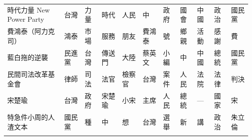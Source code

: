 \documentclass[a4paper, 10pt, conference]{ieeeconf}       %
\begin{document}
\begin{CJK}{UTF8}{bsmi}
\begin{longtable}[c]{@{}L{2.45cm}L{1.1cm}L{1.1cm}L{1.1cm}L{1.1cm}L{1.1cm}L{1.1cm}L{1.1cm}L{1.41cm}L{1.1cm}L{1.1cm}@{}}
時代力量 New Power Party & 台灣 & 力量 & 時代 & 人民 & 中 & 政府 & 國會 & 中國 & 政治 & 國民黨 \\
費鴻泰（阿力克司） & 鴻泰 & 市場 & 服務 & 朋友 & 費鴻泰 & 號 & 鄉親 & 活動 & 感謝 & 費 \\
藍白拖的逆襲 & 民進黨 & 台灣 & 傳送門 & 大陸 & 蔡英文 & 小編 & 中 & 中國 & 總統 & 國民黨 \\
民間司法改革基金會 & 律師 & 司法 & 法官 & 檢察官 & 台灣 & 案件 & 人民 & 法院 & 法律 & 判決 \\
宋楚瑜 & 台灣 & 政府 & 宋楚瑜 & 小宋 & 主席 & 人民 & 總統 & — & 國家 & 宋 \\
特急件小周的人渣文本 & 國民黨 & 種 & 中 & 想 & 台灣 & 選舉 & 新 & 講 & 政治 & 朱立倫 \\* \bottomrule
\fi
\end{longtable}


\end{CJK}
\end{document}
